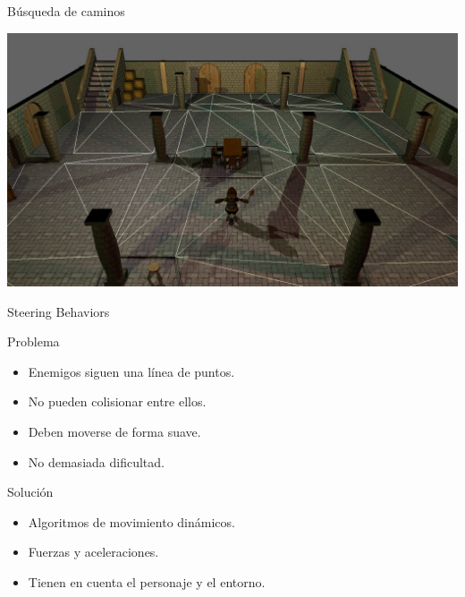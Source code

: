 \documentclass[green]{beamer}
\begin{document}
\begin{frame}{Búsqueda de caminos}
    
    \begin{center}
	\includegraphics[scale=0.23]{img/siontower-navmesh.jpg}
    \end{center}
    
\end{frame}
    
    
\begin{frame}{Steering Behaviors}
    
    \begin{alertblock}{Problema}
	\begin{itemize}
	    \item Enemigos siguen una línea de puntos.
	    \item No pueden colisionar entre ellos.
	    \item Deben moverse de forma suave.
	    \item No demasiada dificultad.
	\end{itemize}
    \end{alertblock}
    
    \begin{block}{Solución}
	\begin{itemize}
	    \item Algoritmos de movimiento dinámicos.
	    \item Fuerzas y aceleraciones.
	    \item Tienen en cuenta el personaje y el entorno.
	\end{itemize}
    \end{block}
\end{frame}
    
    
\end{document}
